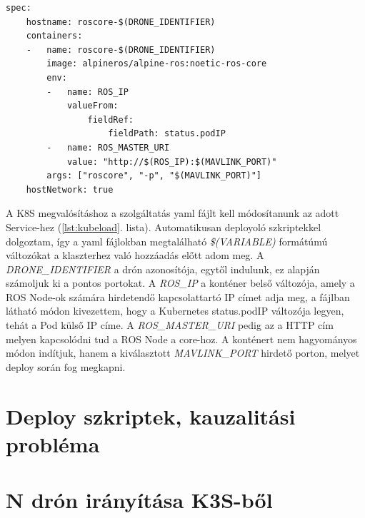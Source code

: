 \begin{lstlisting}[caption={Roscore Service specifikációja inkrementális változókkal}, label={lst:kubeload}]
spec:
	hostname: roscore-$(DRONE_IDENTIFIER)
	containers:
	-	name: roscore-$(DRONE_IDENTIFIER)
		image: alpineros/alpine-ros:noetic-ros-core 
		env:
		-	name: ROS_IP
			valueFrom:
				fieldRef:
					fieldPath: status.podIP
		-	name: ROS_MASTER_URI
			value: "http://$(ROS_IP):$(MAVLINK_PORT)"
		args: ["roscore", "-p", "$(MAVLINK_PORT)"]
	hostNetwork: true
\end{lstlisting}

\noindent
A K8S megvalósításhoz a szolgáltatás yaml fájlt kell módosítanunk az adott Service-hez (\ref{lst:kubeload}. lista). Automatikusan deployoló szkriptekkel dolgoztam, így a yaml fájlokban megtalálható \emph{\$(VARIABLE)} formátúmú változókat a klaszterhez való hozzáadás előtt adom meg. A \emph{DRONE\_IDENTIFIER} a drón azonosítója, egytől indulunk, ez alapján számoljuk ki a pontos portokat. A \emph{ROS\_IP} a konténer belső változója, amely a ROS Node-ok számára hirdetendő kapcsolattartó IP címet adja meg, a fájlban látható módon kivezettem, hogy a Kubernetes status.podIP változója legyen, tehát a Pod külső IP címe. A \emph{ROS\_MASTER\_URI} pedig az a HTTP cím melyen kapcsolódni tud a ROS Node a core-hoz. A konténert nem hagyományos módon indítjuk, hanem a kiválasztott \emph{MAVLINK\_PORT} hirdető porton, melyet deploy során fog megkapni.

\section{Deploy szkriptek, kauzalitási probléma}



\section{N drón irányítása K3S-ből}
